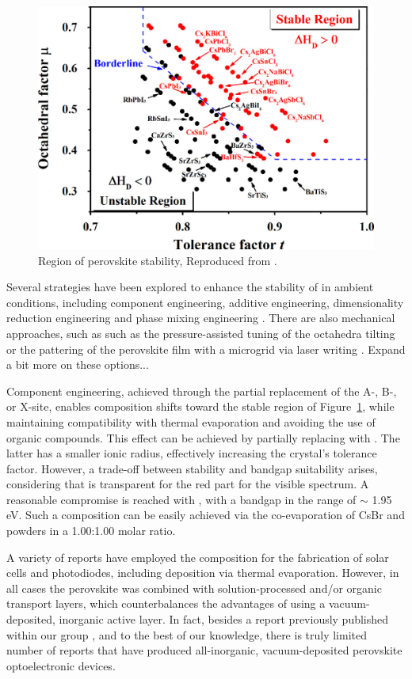 \begin{figure}[htbp]
  \centering
  \medskip
  \includegraphics[width=.67\textwidth]{chapters/introduction/image/perovskite_stability.jpeg}
  \caption[Short caption for Table of Figures]{Region of perovskite stability, Reproduced from \cite{Sun2017ThermodynamicPerovskites}.}
  \label{fig:ch2:perovskite_stable_region}
\end{figure}

Several strategies have been explored to enhance the stability of  in ambient conditions, including component engineering, additive engineering, dimensionality reduction engineering and phase mixing engineering \cite{Lei2024StabilityPerovskites}. There are also mechanical approaches, such as such as the pressure-assisted tuning of the  octahedra tilting \cite{Ke2021PreservingTilt} or the pattering of the perovskite film with a  microgrid via laser writing \cite{Steele2022AnFilms}. Expand a bit more on these options...

Component engineering, achieved through the partial replacement of the A-, B-, or X-site, enables composition shifts toward the stable region of Figure~\ref{fig:ch2:perovskite_stable_region}, while maintaining compatibility with thermal evaporation and avoiding the use of organic compounds. This effect can be achieved by partially replacing  with . The latter has a smaller ionic radius, effectively increasing the crystal's tolerance factor. However, a trade-off between stability and bandgap suitability arises, considering that  is transparent for the red part for the visible spectrum. A reasonable compromise is reached with , with a bandgap in the range of $\sim$ 1.95 eV. Such a composition can be easily achieved via the co-evaporation of CsBr and  powders in a 1.00:1.00 molar ratio. 


A variety of reports have employed the  composition for the fabrication of solar cells and photodiodes, including deposition via thermal evaporation. However, in all cases the perovskite was combined with solution-processed and/or organic transport layers, which counterbalances the advantages of using a vacuum-deposited, inorganic active layer. In fact, besides a report previously published within our group \cite{PintorMonroy2021All-EvaporatedApplications}, and to the best of our knowledge, there is truly limited number of reports that have produced all-inorganic, vacuum-deposited perovskite optoelectronic devices. 


